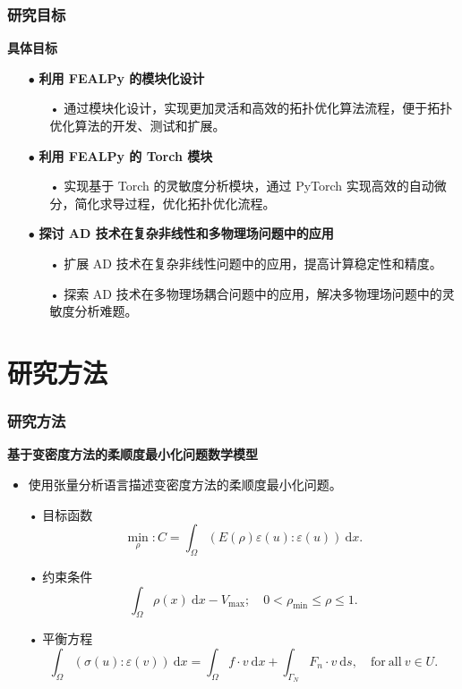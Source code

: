 \documentclass{beamer}
\numberwithin{subsection}{section}
\begin{document}
\begin{frame}
	\frametitle{研究目标}
	\textbf{具体目标}
    \begin{itemize}
        \item[$\bullet$]\textbf{利用 FEALPy 的模块化设计}
        \begin{itemize}
            \item[•]通过模块化设计，实现更加灵活和高效的拓扑优化算法流程，便于拓扑优化算法的开发、测试和扩展。
        \end{itemize}
        \vspace{0.3cm}
        \item[$\bullet$]\textbf{利用 FEALPy 的 Torch 模块}
        \begin{itemize}
	        \item[•]实现基于 Torch 的灵敏度分析模块，通过 PyTorch 实现高效的自动微分，简化求导过程，优化拓扑优化流程。
        \end{itemize}
        \vspace{0.3cm}
        \item[$\bullet$]\textbf{探讨 AD 技术在复杂非线性和多物理场问题中的应用}
        \begin{itemize}
            \item[•]扩展 AD 技术在复杂非线性问题中的应用，提高计算稳定性和精度。
            \item[•]探索 AD 技术在多物理场耦合问题中的应用，解决多物理场问题中的灵敏度分析难题。
        \end{itemize}
    \end{itemize}
\end{frame}

\section{研究方法}

\begin{frame}
	\frametitle{研究方法}
	 \textbf{基于变密度方法的柔顺度最小化问题数学模型}
	 \begin{itemize}
	            \item 使用张量分析语言描述变密度方法的柔顺度最小化问题。
	            \item[•]目标函数
	            $$\min_{\rho} :C = \int_{\Omega}(E(\rho)\varepsilon(u):\varepsilon(u))~\mathrm{d}x.$$
	            \item[•]约束条件
	            $$\int_\Omega\rho(x)~\mathrm{d}x - V_{\max};\quad0<\rho_{\min}\leq\rho\leq1.$$
	            \item[•]平衡方程
	            $$\int_{\Omega}(\sigma(u):\varepsilon(v))~\mathrm{d}x = \int_{\Omega}f\cdot{v}~\mathrm{d}x + \int_{\Gamma_N}F_n\cdot{v}~\mathrm{d}s,\quad\mathrm{for~all}~v\in{U}.$$
	 \end{itemize}
\end{frame}
\end{document}
